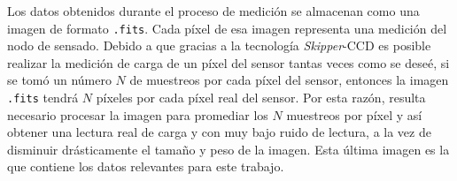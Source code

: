 \indent Los datos obtenidos durante el proceso de medición se almacenan como una imagen de formato \verb|.fits|. Cada píxel de esa imagen representa una medición del nodo de sensado. Debido a que gracias a la tecnología \textit{Skipper}-CCD es posible realizar la medición de carga de un píxel del sensor tantas veces como se deseé, si se tomó un número $N$ de muestreos por cada píxel del sensor, entonces la imagen \verb|.fits| tendrá $N$ píxeles por cada píxel real del sensor. Por esta razón, resulta necesario procesar la imagen para promediar los $N$ muestreos por píxel y así obtener una lectura real de carga y con muy bajo ruido de lectura, a la vez de disminuir drásticamente el tamaño y peso de la imagen. Esta última imagen es la que contiene los datos relevantes para este trabajo.

